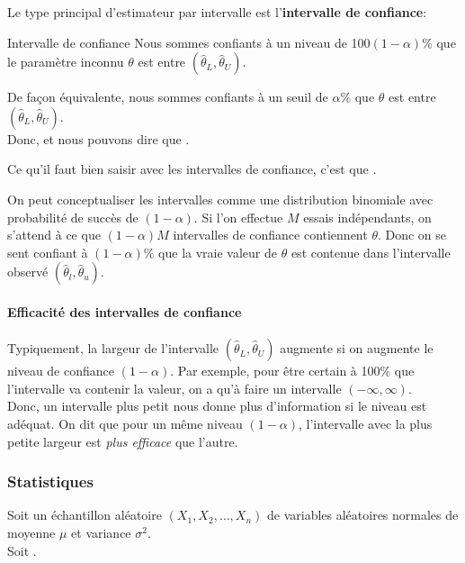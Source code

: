 \documentclass[10pt, french]{article}
\begin{document}
\begin{multicols*}{2}
Le type principal d'estimateur par intervalle est l'\textbf{intervalle de confiance}:
\begin{algo}{Intervalle de confiance}
Nous sommes confiants à un niveau de 100$(1 - \alpha)$\% que le paramètre inconnu $\theta$ est entre $(\hat{\theta}_{L}, \hat{\theta}_{U})$. 

De façon équivalente, nous sommes confiants à un seuil de $\alpha$\% que $\theta$ est entre $(\hat{\theta}_{L}, \hat{\theta}_{U})$.\\

Donc,  et nous pouvons dire que  .
\end{algo}

Ce qu'il faut bien saisir avec les intervalles de confiance, c'est que .

On peut conceptualiser les intervalles comme une distribution binomiale avec probabilité de succès de $(1 - \alpha)$. Si l'on effectue $M$ essais indépendants, on s'attend à ce que $(1 - \alpha)M$ intervalles de confiance contiennent $\theta$. Donc on se sent confiant à $(1 - \alpha)\%$ que la vraie valeur de $\theta$ est contenue dans l'intervalle observé $(\hat{\theta}_{l}, \hat{\theta}_{u})$.

\paragraph{Efficacité des intervalles de confiance}
Typiquement, la largeur de l'intervalle $(\hat{\theta}_{L}, \hat{\theta}_{U})$ augmente si on augmente le niveau de confiance $(1 - \alpha)$. Par exemple, pour être certain à 100\% que l'intervalle va contenir la valeur, on a qu'à faire un intervalle $(-\infty, \infty)$.\\

Donc, un intervalle plus petit nous donne plus d'information si le niveau est adéquat. On dit que pour un même niveau $(1 - \alpha)$, l'intervalle avec la plus petite largeur est \textit{plus efficace} que l'autre.



\columnbreak
\subsubsection{Statistiques}
\begin{rappel_enhanced}
Soit un échantillon aléatoire $(X_{1}, X_{2}, \dots, X_{n})$ de variables aléatoires normales de moyenne $\mu$ et variance $\sigma^{2}$.\\
Soit .\\


\end{rappel_enhanced}
\end{multicols*}
\end{document}
